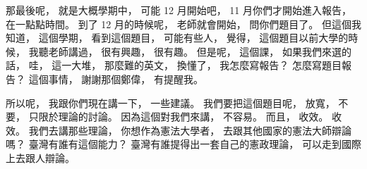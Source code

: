 \hypertarget{w01:cue:792}{}那最後呢，
\hypertarget{w01:cue:793}{}就是大概學期中，
\hypertarget{w01:cue:794}{}可能 12 月開始吧，
\hypertarget{w01:cue:795}{}11 月你們才開始進入報告，
\hypertarget{w01:cue:796}{}在一點點時間。
\hypertarget{w01:cue:797}{}到了 12 月的時候呢，
\hypertarget{w01:cue:798}{}老師就會開始，
\hypertarget{w01:cue:799}{}問你們題目了。
\hypertarget{w01:cue:800}{}但這個我知道，
\hypertarget{w01:cue:801}{}這個學期，
\hypertarget{w01:cue:802}{}看到這個題目，
\hypertarget{w01:cue:803}{}可能有些人，
\hypertarget{w01:cue:804}{}覺得，
\hypertarget{w01:cue:805}{}這個題目以前大學的時候，
\hypertarget{w01:cue:806}{}我聽老師講過，
\hypertarget{w01:cue:807}{}很有興趣，
\hypertarget{w01:cue:808}{}很有趣。
\hypertarget{w01:cue:809}{}但是呢，
\hypertarget{w01:cue:810}{}這個課，
\hypertarget{w01:cue:811}{}如果我們來選的話，
\hypertarget{w01:cue:812}{}哇，
\hypertarget{w01:cue:813}{}這一大堆，
\hypertarget{w01:cue:814}{}那麼難的英文，
\hypertarget{w01:cue:815}{}換懂了，
\hypertarget{w01:cue:816}{}我怎麼寫報告？
\hypertarget{w01:cue:817}{}怎麼寫題目報告？
\hypertarget{w01:cue:818}{}這個事情，
\hypertarget{w01:cue:819}{}謝謝那個鄭偉，
\hypertarget{w01:cue:820}{}有提醒我。

\hypertarget{w01:cue:821}{}所以呢，
\hypertarget{w01:cue:822}{}我跟你們現在講一下，
\hypertarget{w01:cue:823}{}一些建議。
\hypertarget{w01:cue:824}{}我們要把這個題目呢，
\hypertarget{w01:cue:825}{}放寬，
\hypertarget{w01:cue:826}{}不要，
\hypertarget{w01:cue:827}{}只限於理論的討論。
\hypertarget{w01:cue:828}{}因為這個對我們來講，
\hypertarget{w01:cue:829}{}不容易。
\hypertarget{w01:cue:830}{}而且，
\hypertarget{w01:cue:831}{}收效。
\hypertarget{w01:cue:832}{}收效。
\hypertarget{w01:cue:833}{}我們去講那些理論，
\hypertarget{w01:cue:834}{}你想作為憲法大學者，
\hypertarget{w01:cue:835}{}去跟其他國家的憲法大師辯論嗎？
\hypertarget{w01:cue:836}{}臺灣有誰有這個能力？
\hypertarget{w01:cue:837}{}臺灣有誰提得出一套自己的憲政理論，
\hypertarget{w01:cue:838}{}可以走到國際上去跟人辯論。

